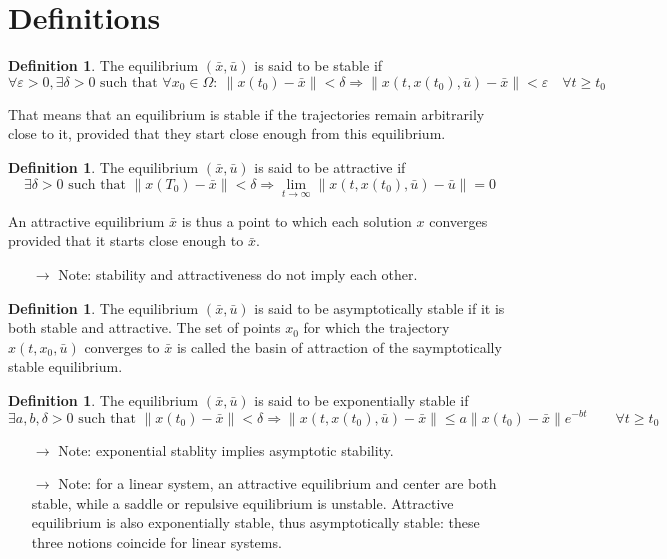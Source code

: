 \documentclass[12pt, openany]{report}
\theoremstyle{definition}
\newtheorem{definition}[thm]{Definition}
\begin{document}
\section{Definitions}
\begin{definition}
    The equilibrium \((\bar x,\bar u)\) is said to be stable if \begin{equation}
        \forall \varepsilon>0, \exists \delta>0 \text{ such that } \forall x_0\in \Omega:\: \lVert x(t_0)-\bar x\rVert <\delta \Longrightarrow \lVert x(t,x(t_0), \bar u)-\bar x\rVert<\varepsilon \quad \forall t\ge t_0
    \end{equation}
\end{definition}
That means that an equilibrium is stable if the trajectories remain arbitrarily close to it, provided that they start close enough from this equilibrium. 
\begin{definition}
    The equilibrium \((\bar x,\bar u)\) is said to be attractive if \begin{equation}
        \exists \delta >0\text{ such that } \lVert x(T_0)-\bar x\rVert <\delta \Longrightarrow \lim_{t\rightarrow \infty} \lVert x(t,x(t_0),\bar u)-\bar u\rVert=0
    \end{equation}
\end{definition}
An attractive equilibrium \(\bar x\) is thus a point to which each solution \(x\) converges provided that it starts close enough to \(\bar x\). 
\begin{itemize}
    \item [\(\rightarrow\)] Note: stability and attractiveness do not imply each other.
\end{itemize}
\begin{definition}
    The equilibrium \((\bar x,\bar u)\) is said to be asymptotically stable if it is both stable and attractive. The set of points \(x_0\) for which the trajectory \(x(t,x_0, \bar u)\) converges to \(\bar x\) is called the basin of attraction of the saymptotically stable equilibrium. 
\end{definition}
\begin{definition}
    The equilibrium \((\bar x,\bar u)\) is said to be exponentially stable if \begin{equation}
        \exists a,b,\delta>0 \text{ such that }\lVert x(t_0)-\bar x\rVert <\delta \Longrightarrow \lVert x(t,x(t_0),\bar u)-\bar x\rVert \le a\lVert x(t_0)-\bar x\rVert e^{-bt}\qquad \forall t\ge t_0
    \end{equation}
\end{definition}
\begin{itemize}
    \item [\(\rightarrow\)] Note: exponential stablity implies asymptotic stability.
    \item [\(\rightarrow\)] Note: for a linear system, an attractive equilibrium and center are both stable, while a saddle or repulsive equilibrium is unstable. Attractive equilibrium is also exponentially stable, thus asymptotically stable: these three notions coincide for linear systems. 
\end{itemize}
\end{document}
